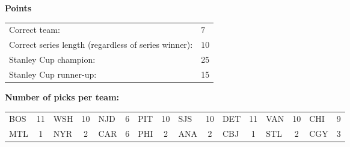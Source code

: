\documentclass[10pt]{article}
\begin{document}
{\bf Points}\\
\begin{minipage}{12cm}
    \begin{tabular}{l l}
        Correct team:	& $7$\\
        Correct series length (regardless of series winner):	& $10$\\
        Stanley Cup champion:	& 25\\
        Stanley Cup runner-up:	& 15\\
    \end{tabular}

    \vspace{1cm}
    {\bf Number of picks per team:}\\
    \begin{tabular}{lc | lc | lc | lc | lc | lc | lc | lc }
        BOS & 11 & WSH & 10 & NJD & 6 & PIT & 10 & SJS & 10 & DET & 11 & VAN & 10 & CHI & 9 \\
        MTL & 1 & NYR & 2 & CAR & 6 & PHI & 2 & ANA & 2 & CBJ & 1 & STL & 2 & CGY & 3 \\
    \end{tabular}
\end{minipage}
\end{document}
